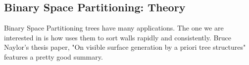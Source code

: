 \pagebreak

\subsection{Binary Space Partitioning: Theory} \label{Binary Space Partitioning: Theory}
Binary Space Partitioning trees have many applications. The one we are interested in is how \doom{} uses them to sort walls rapidly and consistently. Bruce Naylor's thesis paper, "On visible surface generation by a priori tree structures" features a pretty good summary.\\
\par

